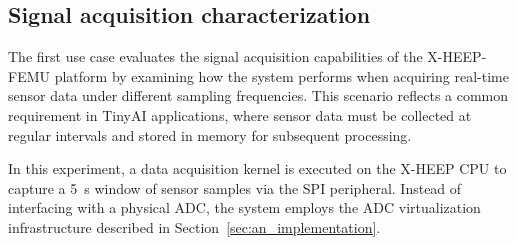         \begin{table}[tp]
            \caption{Experimental setup for signal acquisition characterization on \mbox{X-HEEP-FEMU} and \mbox{HEEPocrates}.}
            \label{tbl:acquisition_setup}
            \centering
        \end{table}

        \subsection{Signal acquisition characterization}
            
            The first use case evaluates the signal acquisition capabilities of the \mbox{X-HEEP-FEMU} platform by examining how the system performs when acquiring real-time sensor data under different sampling frequencies. This scenario reflects a common requirement in TinyAI applications, where sensor data must be collected at regular intervals and stored in memory for subsequent processing.
            
            In this experiment, a data acquisition kernel is executed on the \mbox{X-HEEP} CPU to capture a \SI{5}{\second} window of sensor samples via the SPI peripheral. Instead of interfacing with a physical ADC, the system employs the ADC virtualization infrastructure described in Section~\ref{sec:an_implementation}.
            
